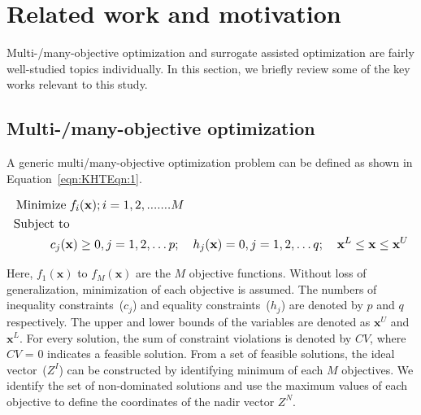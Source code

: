 \documentclass[twocolumn,10pt]{asme2ej}
\begin{document}
\vspace{-1em}
\section{Related work and motivation}
\label{sec:KHTsec:2}

Multi-/many-objective optimization and surrogate assisted optimization are fairly well-studied topics individually. In this section, we briefly review some of the key works relevant to this study. 
\vspace{-1em}
\subsection{Multi-/many-objective optimization}

A generic multi/many-objective optimization problem can be defined as shown in Equation~\ref{eqn:KHTEqn:1}.

\begin{equation}\footnotesize
\begin{aligned}
\operatorname{Minimize}\; & f_i(\textbf{x}); i=1,2,.......M \\
\text{Subject to} & \\
& \hspace{-0.6cm}c_j(\textbf{x})\ge 0, j=1,2,\ldots p ; \quad h_j(\textbf{x}) = 0, j=1,2,\ldots q;  \quad \textbf{x}^{L}\le\textbf{x}\le\textbf{x}^{U}\\ 
\label{eqn:KHTEqn:1}
\end{aligned}
\end{equation}

\noindent Here, $f_1(\textbf{x})$  to $f_M(\textbf{x})$ are the $M$ objective functions. Without loss of generalization, minimization of each objective is assumed. The numbers of inequality constraints~($c_j$) and equality constraints~($h_j$) are denoted by $p$ and $q$ respectively. The upper and lower bounds of the variables are denoted as $\textbf{x}^{U}$ and $\textbf{x}^{L}$. For every solution, the sum of constraint violations is denoted by $CV$, where $CV$ = $0$ indicates a feasible solution. From a set of feasible solutions, the ideal vector~($Z^I$) can be constructed by identifying minimum of each $M$ objectives. We identify the set of non-dominated solutions and use the maximum values of each objective to define the coordinates of the nadir vector $Z^N$.
\end{document}
